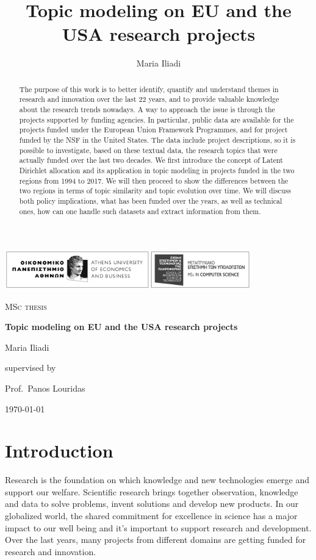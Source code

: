 \documentclass[12pt]{report}
\title{Topic modeling on EU and the USA research projects}
\author{Maria Iliadi}
\begin{document}
\begin{titlepage}
	\centering
	\includegraphics[width=0.8\textwidth]{figs/logo.jpg}\par\vspace{4cm}
	{\scshape\Large MSc thesis\par}
	\vspace{1.5cm}
	{\Large\bfseries Topic modeling on EU and the USA research projects\par}
	\vspace{2cm}
	{\Large Maria Iliadi\par}
	\vfill
	supervised by\par
	Prof.~Panos Louridas

	\vfill

	{\large \today\par}
\end{titlepage}
\tableofcontents

\begin{abstract}
The purpose of this work is to better identify, quantify and understand themes
in research and innovation over the last 22 years, and to provide valuable
knowledge about the research trends nowadays. A way to approach the issue is
through the projects supported by funding agencies. In particular, public data
are available for the projects funded under the European Union Framework
Programmes, and for project funded by the NSF in the United States. The data
include project descriptions, so it is possible to investigate, based on these
textual data, the research topics that were actually funded over the last two
decades. We first introduce the concept of Latent Dirichlet allocation and its
application in topic modeling in projects funded in the two regions from 1994
to 2017. We will then proceed to show the differences between the two regions in
terms of topic similarity and topic evolution over time. We will discuss both
policy implications, what has been funded over the years, as well as technical
ones, how can one handle such datasets and extract information from them.
\end{abstract}


\section{Introduction}
Research is the foundation on which knowledge and new technologies emerge and
support our welfare. Scientific research brings together observation, knowledge
and data to solve problems, invent solutions and develop new products. In our
globalized world, the shared commitment for excellence in science has a major
impact to our well being and it's important to support research and development.
Over the last years, many projects from different domains are getting funded for
research and innovation.
\end{document}
